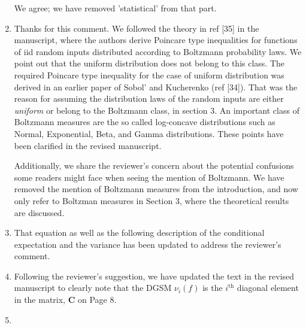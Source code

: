 \documentclass[11pt,final]{article}
\newcommand{\referee}[1]{\vspace{.1ex}\noindent{\textcolor{blue}{#1}}}
\begin{document}
\begin{enumerate}[wide, labelwidth=!, labelindent=0pt]
We agree; we have removed 'statistical' from that part.

\item \referee{7.29-30: Any PDF can be written in a Boltzmann form, V(x) is
just the negative log-PDF, I am not sure if it is necessary to bring up a
Boltzmann distribution language here.  Also, it could be confused with
Maxwell-Boltzmann distribution, which is a very specific PDF form.} 

Thanks for
this comment. We followed the theory in ref [35] in the manuscript, where the
authors derive Poincare type inequalities for functions of iid random inputs
distributed according to Boltzmann probability laws.  We point out that the
uniform distribution does not belong to this class.  The required Poincare type
inequality for the case of uniform distribution was derived in an earlier paper
of Sobol' and Kucherenko (ref [34]).  That was the reason for assuming the
distribution laws of the random inputs are either \emph{uniform} or belong to
the Boltzmann class, in section 3. An important class of Boltzmann measures are
the so called log-concave distributions such as Normal, Exponential, Beta, and
Gamma distributions. These points have been clarified in the revised
manuscript. 

Additionally, we share the reviewer's concern about the potential confusions
some readers might face when seeing the mention of Boltzmann. We have removed
the mention of Boltzmann measures from the introduction, and now only refer to
Boltzman measures in Section 3, where the theoretical results are discussed. 
 

\item \referee{7.40: Explain what E and V are with respect to in Eq (8).}


That equation as well as the following description of the conditional 
expectation and the variance has been updated to address the reviewer's comment.

\item \referee{7.50: Just say in words that it is the i-th diagonal element of matrix C.}

Following the reviewer's suggestion, we have updated the text in the revised manuscript to
clearly note that the DGSM $\nu_i(f)$ is the $i^{\text{th}}$ diagonal element in the matrix, $\mathbf{C}$
on Page 8.

\item \referee{10.56: what if there is no eigenvalue gap of O(100)?}


\end{enumerate}
\end{document}
